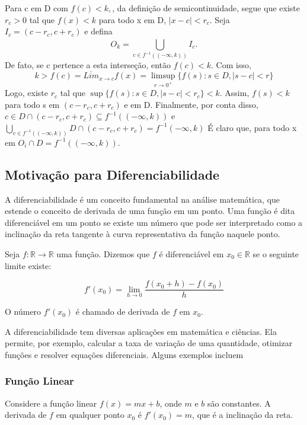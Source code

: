 \documentclass[analysis_notes.tex]{subfiles}
\begin{document}
\begin{proof*}
	Para c em D com \(f(c) < k,\), da defini\c cão de semicontinuidade, segue que
	existe \(r_{c}>0\) tal que \(f(x) < k\) para todo x em D, \(|x-c| < r_{c}.\) Seja
	\(I_{c} = (c-r_{c}, c+r_{c})\) e defina
	\[
		O_{k} = \bigcup_{c\in f^{-1}((-\infty, k))}^{}{I_{c}.}
	\]
	De fato, se c pertence a esta interse\c cão, então \(f(c) < k\). Com isso,
	\[
		k > f(c) = \overline{Lim}_{x\to c}f(x) = \limsup_{r\to 0^{+}}\{f(s):s\in D, |s-c|< r\}
	\]
	Logo, existe \(r_{c}\) tal que \(\sup\{f(s):s\in D, |s-c|<r_{c}\} < k.\) Assim,
	\(f(s)<k\) para todo s em \((c-r_{c}, c+r_{c})\) e em D. Finalmente, por conta disso,
	\(c\in D\cap(c-r_{c}, c+r_{c})\subseteq{f^{-1}((-\infty, k))}\) e \(\bigcup_{c\in f^{-1}((-\infty, k))}^{}{D\cap (c-r_{c}, c+r_{c})} = f^{-1}(-\infty, k)\)
	É claro que, para todo x em \(O_{i}\cap D = f^{-1}((-\infty, k))\).
\end{proof*}

\subsection{Motiva\c cão para Diferenciabilidade}
A diferenciabilidade é um conceito fundamental na análise matemática, que
estende o conceito de derivada de uma função em um ponto. Uma função é dita
diferenciável em um ponto se existe um número que pode ser interpretado como
a inclinação da reta tangente à curva representativa da função naquele ponto.

Seja $f: \mathbb{R} \to \mathbb{R}$ uma função. Dizemos que $f$ é
diferenciável em $x_0 \in \mathbb{R}$ se o seguinte limite existe:

\begin{equation}
	f'(x_0) = \lim_{{h \to 0}} \frac{f(x_0 + h) - f(x_0)}{h}
\end{equation}

O número $f'(x_0)$ é chamado de derivada de $f$ em $x_0$.

A diferenciabilidade tem diversas aplicações em matemática e ciências.
Ela permite, por exemplo, calcular a taxa de variação de uma quantidade,
otimizar funções e resolver equações diferenciais. Alguns exemplos incluem

\subsubsection{Função Linear}

Considere a função linear $f(x) = mx + b$, onde $m$ e $b$ são constantes. A derivada de $f$ em qualquer ponto $x_0$ é $f'(x_0) = m$, que é a inclinação da reta.
\end{document}
